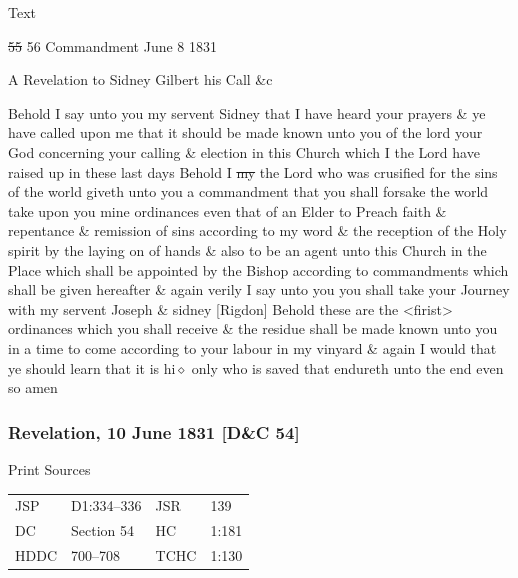 			\begin{description}
				\item[Text]
			\end{description}
			
				\begin{tightcenter}
				\sout{55} 56 Commandment June 8 1831
				\end{tightcenter}
				
				A Revelation to Sidney Gilbert his Call \&c
				
				Behold I say unto you my servent Sidney that I have heard your prayers \& ye have called upon me that it should be made known unto you of the lord your God concerning your calling \& election in this Church which I the Lord have raised up in these last days Behold I \sout{my} the Lord who was crusified for the sins of the world giveth unto you a commandment that you shall forsake the world take upon you mine ordinances even that of an Elder to Preach faith \& repentance \& remission of sins according to my word \& the reception of the Holy spirit by the laying on of hands \& also to be an agent unto this Church in the Place which shall be appointed by the Bishop according to commandments which shall be given hereafter \& again verily I say unto you you shall take your Journey with my servent Joseph \& sidney [Rigdon] Behold these are the <firist> ordinances which you shall receive \& the residue shall be made known unto you in a time to come according to your labour in my vinyard \& again I would that ye should learn that it is hi$\diamond$ only who is saved that endureth unto the end even so amen
				
		\subsubsection{Revelation, 10 June 1831 [D\&C 54]}
			\label{EMS-1831-JS-10-JUN-1831}
		
			\begin{description}
				\item[Print Sources]
			\end{description}

				\begin{tabular}{p{0.5in}p{1in}p{0.5in}p{1in}}
				JSP	 	& D1:334--336	& JSR 		& 139 \\
				DC	 	& Section 54 	& HC 		& 1:181 \\
				HDDC 	& 700--708		& TCHC 		& 1:130 \\
				\end{tabular}
			
